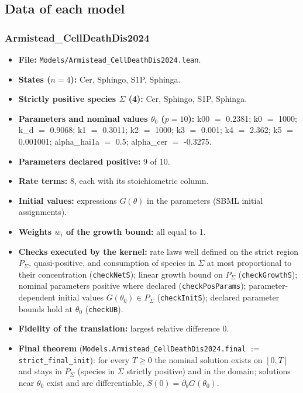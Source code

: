 \subsection*{Data of each model}

\subsubsection*{Armistead\_CellDeathDis2024}

\begin{itemize}\itemsep0pt\small
\item \textbf{File:} \texttt{Models/Armistead\_CellDeathDis2024.lean}.
\item \textbf{States ($n=4$):} Cer, Sphingo, S1P, Sphinga.
\item \textbf{Strictly positive species $\Sigma$ (4):} Cer, Sphingo, S1P, Sphinga.
\item \textbf{Parameters and nominal values $\theta_0$ ($p=10$):} k00 $=$ 0.2381; k0 $=$ 1000; k\_d $=$ 0.9068; k1 $=$ 0.3011; k2 $=$ 1000; k3 $=$ 0.001; k4 $=$ 2.362; k5 $=$ 0.001001; alpha\_hai1a $=$ 0.5; alpha\_cer $=$ -0.3275.
\item \textbf{Parameters declared positive:} 9 of 10.
\item \textbf{Rate terms:} 8, each with its stoichiometric column.
\item \textbf{Initial values:} expressions $G(\theta)$ in the parameters (SBML initial assignments).
\item \textbf{Weights $w_i$ of the growth bound:} all equal to 1.
\item \textbf{Checks executed by the kernel:} rate laws well defined on the strict region $P_\Sigma$, quasi-positive, and consumption of species in $\Sigma$ at most proportional to their concentration (\texttt{checkNetS}); linear growth bound on $P_\Sigma$ (\texttt{checkGrowthS}); nominal parameters positive where declared (\texttt{checkPosParams}); parameter-dependent initial values $G(\theta_0)\in P_\Sigma$ (\texttt{checkInitS}); declared parameter bounds hold at $\theta_0$ (\texttt{checkUB}).
\item \textbf{Fidelity of the translation:} largest relative difference 0.
\item \textbf{Final theorem} (\texttt{Models.Armistead\_CellDeathDis2024.final} $:=$ \texttt{strict\_final\_init}): for every $T\ge0$ the nominal solution exists on $[0,T]$ and stays in $P_\Sigma$ (species in $\Sigma$ strictly positive) and in the domain; solutions near $\theta_0$ exist and are differentiable, $S(0)=\partial_\theta G(\theta_0)$.
\end{itemize}

